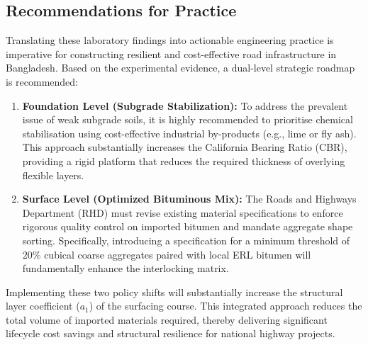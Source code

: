 \documentclass[12pt,a4paper]{article}
\begin{document}
\subsection{Recommendations for Practice}
Translating these laboratory findings into actionable engineering practice is imperative for constructing resilient and cost-effective road infrastructure in Bangladesh. Based on the experimental evidence, a dual-level strategic roadmap is recommended:

\begin{enumerate}
    \item \textbf{Foundation Level (Subgrade Stabilization):} To address the prevalent issue of weak subgrade soils, it is highly recommended to prioritise chemical stabilisation using cost-effective industrial by-products (e.g., lime or fly ash). This approach substantially increases the California Bearing Ratio (CBR), providing a rigid platform that reduces the required thickness of overlying flexible layers.
    \item \textbf{Surface Level (Optimized Bituminous Mix):} The Roads and Highways Department (RHD) must revise existing material specifications to enforce rigorous quality control on imported bitumen and mandate aggregate shape sorting. Specifically, introducing a specification for a minimum threshold of $20\%$ cubical coarse aggregates paired with local ERL bitumen will fundamentally enhance the interlocking matrix. 
\end{enumerate}

Implementing these two policy shifts will substantially increase the structural layer coefficient ($a_1$) of the surfacing course. This integrated approach reduces the total volume of imported materials required, thereby delivering significant lifecycle cost savings and structural resilience for national highway projects.
\end{document}

